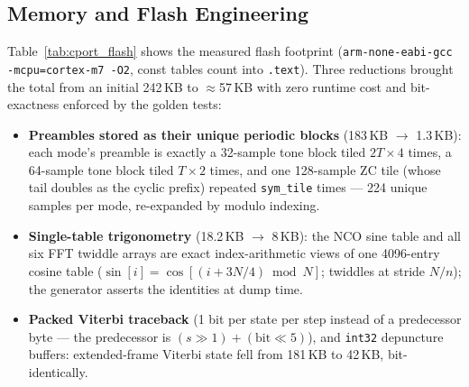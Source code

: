 \subsection{Memory and Flash Engineering}
\label{sec:cport_memory}

Table~\ref{tab:cport_flash} shows the measured flash footprint
(\texttt{arm-none-eabi-gcc -mcpu=cortex-m7 -O2}, const tables count
into \texttt{.text}).  Three reductions brought the total from an
initial 242\,KB to $\approx$57\,KB with zero runtime cost and
bit-exactness enforced by the golden tests:

\begin{itemize}
    \item \textbf{Preambles stored as their unique periodic blocks}
          (183\,KB $\rightarrow$ 1.3\,KB): each mode's preamble is
          exactly a 32-sample tone block tiled $2T{\times}4$ times, a
          64-sample tone block tiled $T{\times}2$ times, and one
          128-sample ZC tile (whose tail doubles as the cyclic prefix)
          repeated \texttt{sym\_tile} times --- 224 unique samples per
          mode, re-expanded by modulo indexing.
    \item \textbf{Single-table trigonometry} (18.2\,KB $\rightarrow$
          8\,KB): the NCO sine table and all six FFT twiddle arrays are
          exact index-arithmetic views of one 4096-entry cosine table
          ($\sin[i]=\cos[(i+3N/4) \bmod N]$; twiddles at stride
          $N/n$); the generator asserts the identities at dump time.
    \item \textbf{Packed Viterbi traceback} (1 bit per state per step
          instead of a predecessor byte --- the predecessor is
          $(s{\gg}1) + (\mathrm{bit}{\ll}5)$), and \texttt{int32}
          depuncture buffers: extended-frame Viterbi state fell from
          181\,KB to 42\,KB, bit-identically.
\end{itemize}

